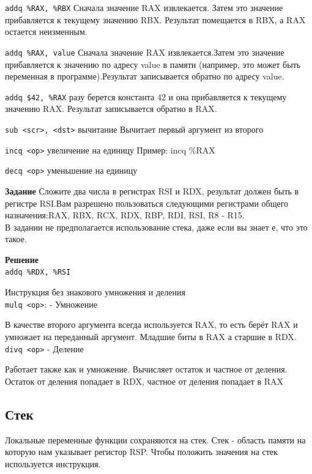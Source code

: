	\texttt {addq \%RAX, \%RBX}  Сначала значение RAX извлекается. Затем это значение прибавляется к текущему значению RBX. Результат помещается в RBX, а RAX остается неизменным.
	
	\texttt {addq \%RAX, value} Сначала значение RAX извлекается.Затем это значение прибавляется к значению по адресу value в памяти (например, это может быть переменная в программе).Результат записывается обратно по адресу value.
	
	\texttt {addq \$42, \%RAX} разу берется константа 42 и она прибавляется к текущему значению RAX. Результат записывается обратно в RAX.
	
	\texttt {sub <scr>, <dst>} вычитание
	Вычитает первый аргумент из второго
	
    \texttt {incq <op>} увеличение на единицу
	Пример: incq \%RAX
	
	\texttt {decq <op>} уменьшение на единицу
	
	\par \textbf{Задание}
	Сложите два числа в регистрах RSI и RDX, результат должен быть в регистре RSI.Вам разрешено пользоваться следующими регистрами общего назначения:RAX, RBX, RCX, RDX, RBP, RDI, RSI, R8 - R15.
	\\В задании не предполагается использование стека, даже если вы знает
	е, что это такое.
	
	\par \textbf{Решение}
	\\
	\texttt{addq \%RDX, \%RSI}
	
	
	Инструкция без знакового умножения и деления
	\\
	\texttt{mulq <op>}: - Умножение
	
    \par В качестве второго аргумента всегда используется RAX, то есть берёт RAX и умножает на переданный аргумент. Младшие биты в RAX а старшие в RDX.
	\\
	\texttt{divq <op>} - Деление
	
	\par Работает также как и умножение. Вычисляет остаток и частное от деления. Остаток от деления попадает в RDX, частное от деления попадает в RAX
	
	\subsection{Стек}
	
	\par Локальные переменные функции сохраняются на стек. Стек - область памяти на которую нам указывает регистор RSP. Чтобы положить значения на стек используется инструкция.
	

